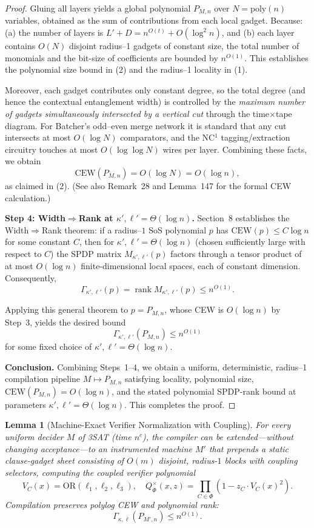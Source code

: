 \documentclass[12pt]{article}
\newcommand{\CEW}{\mathrm{CEW}}
\DeclareMathOperator{\rank}{rank}
\newtheorem{lemma}[theorem]{Lemma}
\theoremstyle{definition}
\theoremstyle{definition}
\theoremstyle{remark}
\theoremstyle{remark}
\begin{document}
\begin{proof}
Gluing all layers yields a global polynomial $P_{M,n}$ over
$N = \mathrm{poly}(n)$ variables, obtained as the sum of contributions
from each local gadget.  Because:
(a) the number of layers is $L' + D = n^{O(t)} + O(\log^2 n)$, and
(b) each layer contains $O(N)$ disjoint radius–1 gadgets of constant size,
the total number of monomials and the bit-size of coefficients are bounded
by $n^{O(1)}$.  This establishes the polynomial size bound in (2) and the
radius–1 locality in (1).

Moreover, each gadget contributes only constant degree, so the total degree
(and hence the contextual entanglement width) is controlled by the
\emph{maximum number of gadgets simultaneously intersected by a vertical
cut} through the time$\times$tape diagram.  For Batcher's odd–even merge
network it is standard that any cut intersects at most $O(\log N)$
comparators, and the NC$^1$ tagging/extraction circuitry touches at most
$O(\log\log N)$ wires per layer.  Combining these facts, we obtain
\[
  \CEW(P_{M,n}) = O(\log N) = O(\log n),
\]
as claimed in (2).  (See also Remark~28 and Lemma~147 for the formal CEW
calculation.)

\medskip
\noindent\textbf{Step 4: Width$\Rightarrow$Rank at $\kappa',\ell' = \Theta(\log n)$.}
Section~8 establishes the Width$\Rightarrow$Rank theorem: if a radius–$1$
SoS polynomial $p$ has $\CEW(p) \le C\log n$ for some constant $C$, then
for $\kappa',\ell' = \Theta(\log n)$ (chosen sufficiently large with respect to $C$)
the SPDP matrix $M_{\kappa',\ell'}(p)$ factors through a tensor product of at most
$O(\log n)$ finite-dimensional local spaces, each of constant dimension.
Consequently,
\[
  \Gamma_{\kappa',\ell'}(p) = \rank M_{\kappa',\ell'}(p) \le n^{O(1)}.
\]

Applying this general theorem to $p = P_{M,n}$, whose CEW is $O(\log n)$ by
Step~3, yields the desired bound
\[
  \Gamma_{\kappa',\ell'}(P_{M,n}) \le n^{O(1)}
\]
for some fixed choice of $\kappa',\ell' = \Theta(\log n)$.

\medskip
\noindent\textbf{Conclusion.}
Combining Steps~1–4, we obtain a uniform, deterministic, radius–1
compilation pipeline $M \mapsto P_{M,n}$ satisfying locality, polynomial
size, $\CEW(P_{M,n}) = O(\log n)$, and the stated polynomial SPDP-rank
bound at parameters $\kappa',\ell' = \Theta(\log n)$.  This completes the proof.
\end{proof}

\begin{lemma}[Machine-Exact Verifier Normalization with Coupling]\label{lem:machine-exact-verifier-norm}
For every uniform decider $M$ of 3SAT (time $n^c$), the compiler can be extended---without changing acceptance---to an instrumented machine $M'$ that prepends a static clause-gadget sheet consisting of $O(m)$ disjoint, radius-$1$ blocks with coupling selectors, computing the coupled verifier polynomial
\[
V_C(x) = \mathrm{OR}(\ell_1, \ell_2, \ell_3), \quad Q_\Phi^{\times}(x,z) = \prod_{C \in \Phi} (1 - z_C \cdot V_C(x)^2).
\]
Compilation preserves polylog CEW and polynomial rank:
\[
\Gamma_{\kappa,\ell}(P_{M',n}) \leq n^{O(1)}.
\]
\end{lemma}
\end{document}
